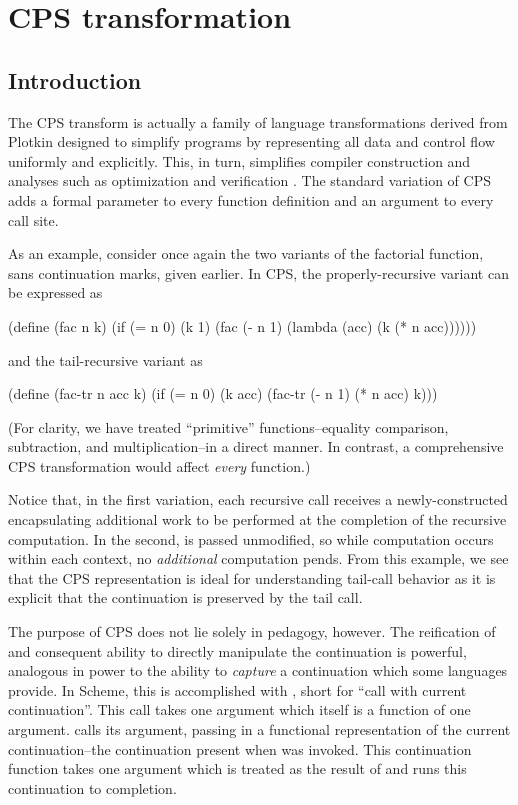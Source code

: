 \chapter{CPS transformation}

\section{Introduction}

The CPS transform is actually a family of language transformations derived from Plotkin
\cite{plotkin1975call} designed to simplify  programs by representing all data and control
flow uniformly and explicitly. This, in turn, simplifies compiler construction and
analyses such as optimization and verification \cite{sabry1994formal}. The standard
variation of CPS adds a formal parameter to every function definition and an argument to
every call site.

As an example, consider once again the two variants of the factorial function, sans
continuation marks, given earlier. In CPS, the properly-recursive variant can be expressed
as
\begin{schemeblock}
(define (fac n k) 
  (if (= n 0)
      (k 1)
      (fac (- n 1) (lambda (acc) (k (* n acc))))))
\end{schemeblock}
and the tail-recursive variant as
\begin{schemeblock}
(define (fac-tr n acc k)
  (if (= n 0)
      (k acc)
      (fac-tr (- n 1) (* n acc) k)))
\end{schemeblock}
(For clarity, we have treated ``primitive'' functions--equality comparison, subtraction,
and multiplication--in a direct manner. In contrast, a comprehensive CPS transformation
would affect \emph{every} function.)

Notice that, in the first variation, each recursive call receives a newly-constructed
 encapsulating additional work to be performed at the completion of the
recursive computation. In the second,  is passed unmodified, so while
computation occurs within each context, no \emph{additional} computation pends. From this
example, we see that the CPS representation is ideal for understanding tail-call behavior
as it is explicit that the continuation is preserved by the tail call.

The purpose of CPS does not lie solely in pedagogy, however. The reification of and
consequent ability to directly manipulate the continuation is powerful, analogous in power
to the ability to \emph{capture} a continuation which some languages provide. In Scheme,
this is accomplished with , short for ``call with current continuation''.
This call takes one argument which itself is a function of one argument. 
calls its argument, passing in a functional representation of the current
continuation--the continuation present when  was invoked. This
continuation function takes one argument which is treated as the result of
 and runs this continuation to completion.

